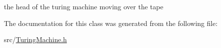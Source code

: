 the head of the turing machine moving over the tape 



\-The documentation for this class was generated from the following file\-:\begin{DoxyCompactItemize}
\item 
src/\hyperlink{TuringMachine_8h}{\-Turing\-Machine.\-h}\end{DoxyCompactItemize}

